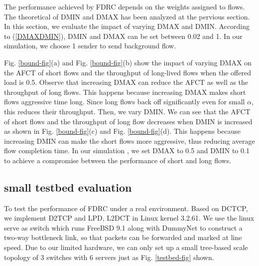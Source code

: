 \documentclass[10pt, conference, letterpaper]{IEEEtran}
\begin{document}
The performance achieved by FDRC depends on the weights assigned to flows. 
The theoretical of  DMIN and DMAX has been 
analyzed at the pervious section. 
In this section, we evaluate the impact of varying DMAX and DMIN.
 According to (\ref{DMAXDMIN}),
 DMIN and DMAX can be set between 0.02 and 1.
In our simulation, we choose 1 sender to send background flow.

Fig. \ref{bound-fig}(a) and Fig. \ref{bound-fig}(b) show the impact of varying 
DMAX on the AFCT of short flows and the throughput of long-lived flows when the offered load is 0.5.
Observe that increasing DMAX can reduce the AFCT as well as the throughput of long flows.
This happens because increasing DMAX makes short flows aggressive time long.
 Since long flows back off significantly even for small $\alpha$, this reduces their throughput. 
Then, we vary DMIN. We can see that the AFCT of short flows and the throughput of long flow decreases 
when DMIN is increased as shown in Fig. \ref{bound-fig}(c) and Fig. \ref{bound-fig}(d). 
 This happens because increasing  DMIN can make the short flows more aggressive, thus reducing average flow completion time.
In our simulation , we set DMAX to 0.5 and DMIN to 0.1 to achieve a compromise between the performance of short and long flows.



\begin{figure*}[!htb]
\centering
{}
\caption{impact of varying DMAX and DMIN on the AFCT of short flows and the throughput performance of long-lived flows. }
\label{bound-fig}
\end{figure*}
\fi

\subsection{small testbed evaluation} \label{evaluation_testbed}


To test the performance of FDRC under a real environment.
Based on DCTCP, we implement  D2TCP and LPD, L2DCT in Linux kernel 3.2.61.
We use the linux serve as switch which runs FreeBSD 9.1 along with DummyNet \cite{dummynet} \cite{MPTCP}  to construct a two-way bottleneck link,
so that packets can be forwarded and marked at line speed. Due to our limited hardware, we can only set up a small tree-based scale topology of 3 switches with 6 servers just
as Fig. \ref{testbed-fig} shown.
\end{document}

